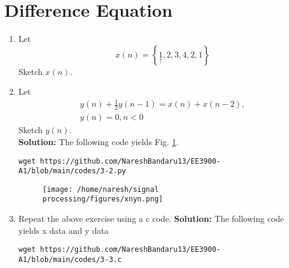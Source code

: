 \documentclass[journal,12pt,twocolumn]{IEEEtran}
\renewcommand\thesection{\arabic{section}}
\newcommand{\solution}{\noindent \textbf{Solution: }}
\providecommand{\cbrak}[1]{\ensuremath{\left\{#1\right\}}}
\numberwithin{equation}{section}
\renewcommand\thesection{\arabic{section}}
\begin{document}
\section{Difference Equation}
\begin{enumerate}[label=\thesection.\arabic*,ref=\thesection.\theenumi]
\item Let
\begin{equation}
x(n) = \cbrak{\underset{\uparrow}{1},2,3,4,2,1}
\end{equation}
Sketch $x(n)$.
\item Let
\begin{multline}
\label{eq:iir_filter}
y(n) + \frac{1}{2}y(n-1) = x(n) + x(n-2), 
\\
 y(n) = 0, n < 0
\end{multline}
Sketch $y(n)$.
\\
\solution The following code yields Fig. \ref{fig:xnyn}.
\begin{lstlisting}
wget https://github.com/NareshBandaru13/EE3900-A1/blob/main/codes/3-2.py
\end{lstlisting}
\begin{figure}[!ht]
\begin{center}
\texttt{[image: /home/naresh/signal processing/figures/xnyn.png]}
\end{center}
\label{fig:xnyn}	
\end{figure}
\item Repeat the above exercise using a c code.
\solution The following code yields x data and y data
\begin{lstlisting}
wget https://github.com/NareshBandaru13/EE3900-A1/blob/main/codes/3-3.c
\end{lstlisting}
\end{enumerate}
\end{document}
